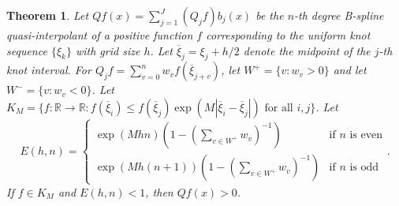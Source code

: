 \documentclass[10pt]{article}
\newcommand{\floorn}{\lfloor \frac{n}{2}\rfloor}
\newcommand{\fracn}{\frac{n}{2}}
\newtheorem{theorem}{Theorem}[section]
\theoremstyle{definition}
\numberwithin{equation}{section}
\numberwithin{figure}{section}
\numberwithin{table}{section}
\begin{document}
\begin{theorem}
Let $Qf(x)=\sum_{j=1}^J(Q_jf)b_j(x)$ be the $n$-th degree B-spline quasi-interpolant of a positive function $f$ corresponding to the uniform knot sequence $\{\xi_k\}$ with grid size $h$. Let $\overline{\xi}_j=\xi_j+h/2$ denote the midpoint of the $j$-th knot interval. For $Q_jf=\sum_{v=0}^nw_vf(\overline\xi_{j+v})$, let $W^+=\{v:w_v>0\}$ and let $W^-=\{v:w_v<0\}$. Let $K_M=\{f:\mathbb{R}\to\mathbb{R}:f(\overline\xi_i)\leq f(\overline\xi_j)\exp(M|\overline\xi_i-\overline\xi_j|)\text{ for all $i,j$}\}$. Let 
$$E(h,n)=\begin{cases}
\exp(Mhn)(1-(\sum_{v\in W^+}w_v)^{-1})&\text{if $n$ is even}\\
\exp(Mh(n+1))(1-(\sum_{v\in W^+}w_v)^{-1})&\text{if $n$ is odd}
\end{cases}.$$ If $f\in K_M$ and $E(h,n)<1$, then $Qf(x)>0$.
\label{thm:1dhiddenpos}
\end{theorem}
\end{document}
